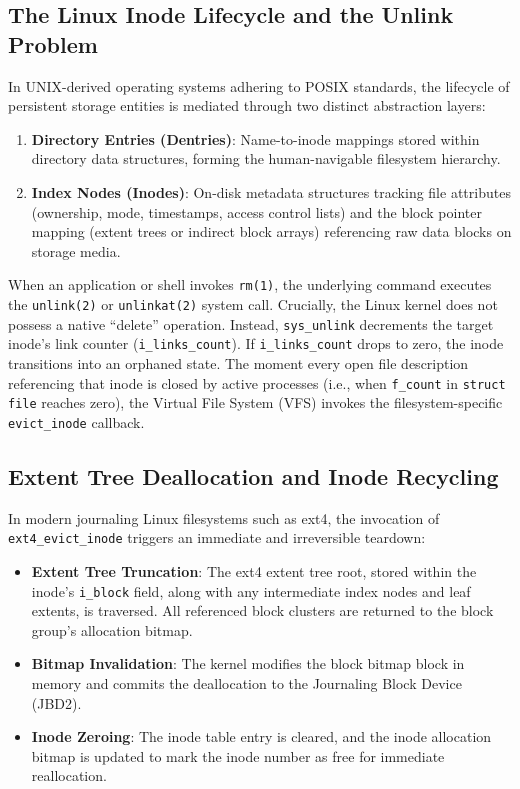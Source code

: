 \documentclass[11pt,a4paper]{article}
\begin{document}
\subsection{The Linux Inode Lifecycle and the Unlink Problem}
In UNIX-derived operating systems adhering to POSIX standards, the lifecycle of persistent storage entities is mediated through two distinct abstraction layers:
\begin{enumerate}[leftmargin=1.5em]
    \item \textbf{Directory Entries (Dentries)}: Name-to-inode mappings stored within directory data structures, forming the human-navigable filesystem hierarchy.
    \item \textbf{Index Nodes (Inodes)}: On-disk metadata structures tracking file attributes (ownership, mode, timestamps, access control lists) and the block pointer mapping (extent trees or indirect block arrays) referencing raw data blocks on storage media.
\end{enumerate}

When an application or shell invokes \texttt{rm(1)}, the underlying command executes the \texttt{unlink(2)} or \texttt{unlinkat(2)} system call. Crucially, the Linux kernel does not possess a native ``delete'' operation. Instead, \texttt{sys\_unlink} decrements the target inode's link counter (\texttt{i\_links\_count}). If \texttt{i\_links\_count} drops to zero, the inode transitions into an orphaned state. The moment every open file description referencing that inode is closed by active processes (i.e., when \texttt{f\_count} in \texttt{struct file} reaches zero), the Virtual File System (VFS) invokes the filesystem-specific \texttt{evict\_inode} callback.

\subsection{Extent Tree Deallocation and Inode Recycling}
In modern journaling Linux filesystems such as ext4, the invocation of \texttt{ext4\_evict\_inode} triggers an immediate and irreversible teardown:
\begin{itemize}[leftmargin=1.5em]
    \item \textbf{Extent Tree Truncation}: The ext4 extent tree root, stored within the inode's \texttt{i\_block} field, along with any intermediate index nodes and leaf extents, is traversed. All referenced block clusters are returned to the block group's allocation bitmap.
    \item \textbf{Bitmap Invalidation}: The kernel modifies the block bitmap block in memory and commits the deallocation to the Journaling Block Device (JBD2).
    \item \textbf{Inode Zeroing}: The inode table entry is cleared, and the inode allocation bitmap is updated to mark the inode number as free for immediate reallocation.
\end{itemize}
\end{document}
